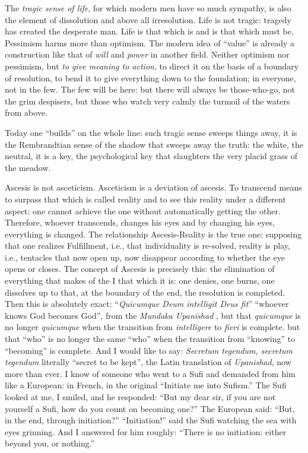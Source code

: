 The \emph{tragic sense of life}, for which modern men have so much sympathy, is also the element of dissolution and above all irresolution. Life is not tragic: tragedy has created the desperate man. Life is that which is and is that which must be. Pessimism harms more than optimism. The modern idea of ``value'' is already a construction like that of \emph{will} and \emph{power} in another field. Neither optimism nor pessimism, but \emph{to give meaning to action}, to direct it on the basis of a boundary of resolution, to bend it to give everything down to the foundation; in everyone, not in the few. The few will be here: but there will always be those-who-go, not the grim despisers, but those who watch very calmly the turmoil of the waters from above.

Today one ``builds'' on the whole line: such tragic sense sweeps things away, it is the Rembrandtian sense of the shadow that sweeps away the truth: the white, the neutral, it is a key, the psychological key that slaughters the very placid grass of the meadow.

Ascesis is not asceticism. Asceticism is a deviation of ascesis. To transcend means to surpass that which is called reality and to see this reality under a different aspect: one cannot achieve the one without automatically getting the other. Therefore, whoever transcends, changes his eyes and by changing his eyes, everything is changed. The relationship Ascesis-Reality is the true one: supposing that one realizes Fulfillment, i.e., that individuality is re-solved, reality is play, i.e., tentacles that now open up, now disappear according to whether the eye opens or closes. The concept of Ascesis is precisely this: the elimination of everything that makes of the I that which it is: one denies, one burns, one dissolves up to that, at the boundary of the end, the resolution is completed. Then this is absolutely exact: ``\emph{Quicumque Deum intelligit Deus fit}'' ``whoever knows God becomes God'', from the \emph{Mundaka Upanishad} , but that \emph{quicumque} is no longer \emph{quicumque} when the transition from \emph{intelligere} to \emph{fieri} is complete. but that ``who'' is no longer the same ``who'' when the transition from ``knowing'' to ``becoming'' is complete. And I would like to say: \emph{Secretum tegendum, secretum tegendum} literally ``secret to be kept'', the Latin translation of \emph{Upanishad}, now more than ever. I know of someone who went to a Sufi and demanded from him like a European: in French, in the original ``Initiate me into Sufism.'' The Sufi looked at me, I smiled, and he responded: ``But my dear sir, if you are not yourself a Sufi, how do you count on becoming one?'' The European said: ``But, in the end, through initiation?'' ``Initiation!'' said the Sufi watching the sea with eyes grinning. And I answered for him roughly: ``There is no initiation: either beyond you, or nothing.''

